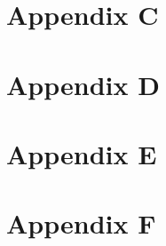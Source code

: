\documentclass[aps,preprint]{revtex4}%
\begin{document}
\section{Appendix C}

\section{Appendix D}

\section{Appendix E}

\section{Appendix F}

\section{}
\end{document}
